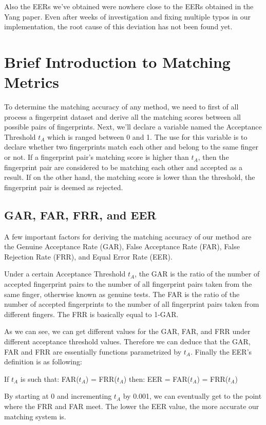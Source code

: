 \documentclass[fyp]{socreport}
\begin{document}
Also the EERs we've obtained were nowhere close to the EERs obtained in the Yang paper. Even after weeks of investigation and fixing multiple typos in our implementation, the root cause of this deviation has not been found yet.

\section{Brief Introduction to Matching Metrics}
To determine the matching accuracy of any method, we need to first of all process a fingerprint dataset and derive all the matching scores between all possible pairs of fingerprints. Next, we'll declare a variable named the Acceptance Threshold $t_A$ which is ranged between 0 and 1. The use for this variable is to declare whether two fingerprints match each other and belong to the same finger or not. If a fingerprint pair's matching score is higher than $t_A$, then the fingerprint pair are considered to be matching each other and accepted as a result. If on the other hand, the matching score is lower than the threshold, the fingerprint pair is deemed as rejected.

\subsection{GAR, FAR, FRR, and EER}
A few important factors for deriving the matching accuracy of our method are the Genuine Acceptance Rate (GAR), False Acceptance Rate (FAR), False Rejection Rate (FRR), and Equal Error Rate (EER).

Under a certain Acceptance Threshold $t_A$, the GAR is the ratio of the number of accepted fingerprint pairs to the number of all fingerprint pairs taken from the same finger, otherwise known as genuine tests. The FAR is the ratio of the number of accepted fingerprints to the number of all fingerprint pairs taken from different fingers. The FRR is basically equal to 1-GAR.

As we can see, we can get different values for the GAR, FAR, and FRR under different acceptance threshold values. Therefore we can deduce that the GAR, FAR and FRR are essentially functions parametrized by $t_A$. Finally the EER's definition is as following:

\begin{center}
	If $t_A$ is such that: FAR($t_A$) = FRR($t_A$) then: EER = FAR($t_A$) = FRR($t_A$) 
\end{center}

By starting at 0 and incrementing $t_A$ by 0.001, we can eventually get to the point where the FRR and FAR meet. The lower the EER value, the more accurate our matching system is.
\end{document}
